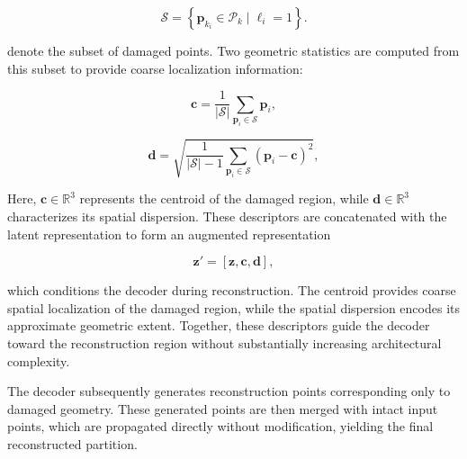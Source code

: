 \begin{equation}
\mathcal{S}
=
\left\{
\mathbf{p}_{k_i}
\in \mathcal{P}_k
\mid
\ell_i = 1
\right\}.
\end{equation}

denote the subset of damaged points. Two geometric statistics are computed from this subset to provide coarse localization information:


\begin{equation}
\mathbf{c} =
\frac{1}{|\mathcal{S}|}
\sum_{\mathbf{p}_i \in \mathcal{S}}
\mathbf{p}_i,
\label{eq:damage_centroid}
\end{equation}

\begin{equation}
\mathbf{d} =
\sqrt{
\frac{1}{|\mathcal{S}|-1}
\sum_{\mathbf{p}_i \in \mathcal{S}}
(\mathbf{p}_i - \mathbf{c})^{2}
},
\label{eq:damage_dispersion}
\end{equation}

Here, \(\mathbf{c} \in \mathbb{R}^{3}\) represents the centroid of the damaged region, while \(\mathbf{d} \in \mathbb{R}^{3}\) characterizes its spatial dispersion. These descriptors are concatenated with the latent representation to form an augmented representation

\begin{equation}
\mathbf{z}' =
[\mathbf{z},
\mathbf{c},
\mathbf{d}],
\end{equation}

which conditions the decoder during reconstruction. The centroid provides coarse spatial localization of the damaged region, while the spatial dispersion encodes its approximate geometric extent. Together, these descriptors guide the decoder toward the reconstruction region without substantially increasing architectural complexity.

The decoder subsequently generates reconstruction points corresponding only to damaged geometry. These generated points are then merged with intact input points, which are propagated directly without modification, yielding the final reconstructed partition.

